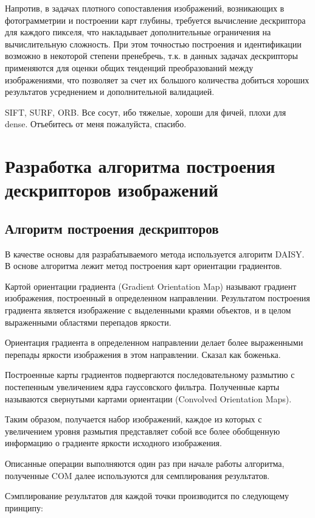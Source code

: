 {{{	Напротив, в задачах плотного сопоставления изображений, возникающих в фотограмметрии и построении карт глубины, требуется вычисление дескриптора для каждого пикселя, что накладывает дополнительные ограничения на вычислительную сложность. При этом точностью построения и идентификации возможно в некоторой степени пренебречь, т.к. в данных задачах дескрипторы применяются для оценки общих тенденций преобразований между изображениями, что позволяет за счет их большого количества добиться хороших результатов усреднением и дополнительной валидацией.
	
	SIFT, SURF, ORB. Все сосут, ибо тяжелые, хороши для фичей, плохи для dense. Отъебитесь от меня пожалуйста, спасибо.
}

\newpage

\section{Разработка алгоритма построения дескрипторов изображений}
{
	\subsection{Алгоритм построения дескрипторов}
	{
		В качестве основы для разрабатываемого метода используется алгоритм DAISY.
		В основе алгоритма лежит метод построения карт ориентации градиентов. 
		
		Картой ориентации градиента (Gradient Orientation Map) называют градиент изображения, построенный в определенном направлении. Результатом построения градиента является изображение с выделенными краями объектов, и в целом выраженными областями перепадов яркости. 
		
		Ориентация градиента в определенном направлении делает более выраженными перепады яркости изображения в этом направлении. Сказал как боженька. 
		
		Построенные карты градиентов подвергаются последовательному размытию с постепенным увеличением ядра гауссовского фильтра. Полученные карты называются свернутыми картами ориентации (Convolved Orientation Maps).
		
		Таким образом, получается набор изображений, каждое из которых с увеличением уровня размытия представляет собой все более обобщенную информацию о градиенте яркости исходного изображения. 
		
		Описанные операции выполняются один раз при начале работы алгоритма, полученные COM далее используются для семплирования результатов. 
		
		Сэмплирование результатов для каждой точки производится по следующему принципу:
		
}}}}
